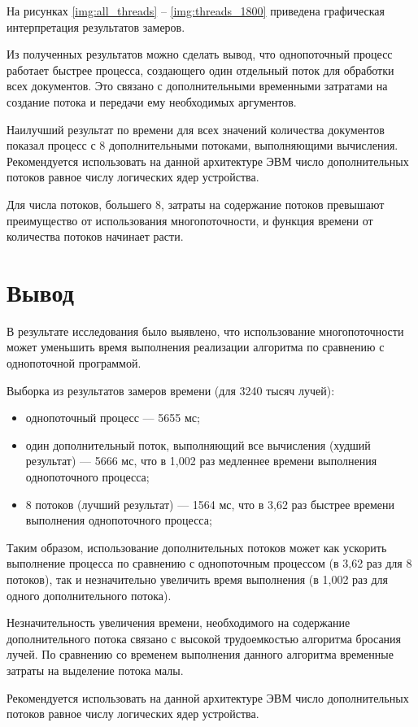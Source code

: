 На рисунках \ref{img:all_threads} -- \ref{img:threads_1800} приведена графическая интерпретация результатов замеров.


\clearpage


Из полученных результатов можно сделать вывод, что однопоточный процесс работает быстрее процесса, создающего один отдельный поток для обработки всех документов. Это связано с дополнительными временными затратами на создание потока и передачи ему необходимых аргументов.

Наилучший результат по времени для всех значений количества документов показал процесс с 8 дополнительными потоками, выполняющими вычисления. Рекомендуется использовать на данной архитектуре ЭВМ число дополнительных потоков равное числу логических ядер устройства.

Для числа потоков, большего 8, затраты на содержание потоков превышают преимущество от использования многопоточности, и функция времени от количества потоков начинает расти.


\section*{Вывод}

В результате исследования было выявлено, что использование многопоточности может уменьшить время выполнения реализации алгоритма по сравнению с однопоточной программой.

Выборка из результатов замеров времени (для 3240 тысяч лучей):
\begin{itemize}
	\item однопоточный процесс --- 5655 мс;
	\item один дополнительный поток, выполняющий все вычисления (худший результат) --- 5666 мс, что в 1,002 раз медленнее времени выполнения однопоточного процесса;
	\item 8 потоков (лучший результат) --- 1564 мс, что в 3,62 раз быстрее времени выполнения однопоточного процесса;
\end{itemize}

Таким образом, использование дополнительных потоков может как ускорить выполнение процесса по сравнению с однопоточным процессом (в 3,62 раз для 8 потоков), так и незначительно увеличить время выполнения (в 1,002 раз для одного дополнительного потока). 

Незначительность увеличения времени, необходимого на содержание дополнительного потока связано с высокой трудоемкостью алгоритма бросания лучей. По сравнению со временем выполнения данного алгоритма временные затраты на выделение потока малы.

Рекомендуется использовать на данной архитектуре ЭВМ число дополнительных потоков равное числу логических ядер устройства.


